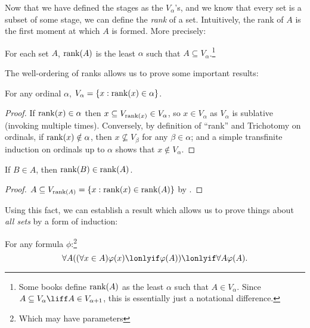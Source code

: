 \documentclass[../../../include/open-logic-section]{subfiles}
\begin{document}

Now that we have defined the stages as the $V_\alpha$'s, and we know
that every set is a subset of some stage, we can define the
\emph{rank} of a set. Intuitively, the rank of $A$ is the first moment
at which $A$ is formed. More precisely:

\begin{defn}
For each set $A$, $\mathrm{rank}(A)$ is the least $\alpha$ such that $A
\subseteq V_\alpha$.\footnote{Some books define $\mathrm{rank}(A)$ as the
least $\alpha$ such that $A \in V_\alpha$. Since $A \subseteq V_\alpha
\liff A \in V_{\alpha+1}$, this is essentially just a notational
difference.}
\end{defn}

The well-ordering of ranks allows us to prove some important results:
\begin{prop}
For any ordinal $\alpha$, $V_\alpha = \{ x : \mathrm{rank}(x) \in \alpha \}$.
\end{prop}

\begin{proof}
If $\mathrm{rank}(x) \in \alpha$ then $x \subseteq V_{\mathrm{rank}(x)} \in
V_\alpha$, so $x \in V_\alpha$ as $V_\alpha$ is sublative (invoking
 multiple times). Conversely, by
definition of ``rank'' and Trichotomy on ordinals, if $\mathrm{rank}(x)
\notin  \alpha$, then $x \nsubseteq V_\beta$ for any $\beta \in
\alpha$; and a simple transfinite induction on ordinals up to $\alpha$
shows that $x \notin V_\alpha$. 
\end{proof}

\begin{prop}
If $B \in A$, then $\mathrm{rank}(B) \in \mathrm{rank}(A)$.
\end{prop}

\begin{proof}
$A \subseteq V_{\mathrm{rank}(A)} = \{ x : \mathrm{rank}(x) \in
\mathrm{rank}(A) \}$ by .
\end{proof}

Using this fact, we can establish a result which allows us to prove
things about \emph{all sets} by a form of induction:

\begin{thm} 
For any formula $\phi$:\footnote{Which may have parameters}
\[
	\forall A((\forall x \in A)\phi(x) \lonlyif \phi(A)) \lonlyif \forall A \phi(A).
\]
\end{thm}
\end{document}
